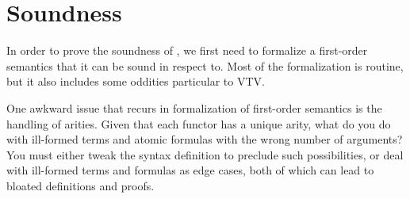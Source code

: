 \documentclass{lipics-v2021}
\begin{document}
\section{Soundness} \label{sec:soundness}

In order to prove the soundness of , we first need to formalize 
a first-order semantics that it can be sound in respect to. Most of the formalization 
is routine, but it also includes some oddities particular to VTV.

One awkward issue that recurs in formalization of first-order semantics is the 
handling of arities. Given that each functor has a unique arity,
what do you do with ill-formed terms and atomic formulas with the wrong 
number of arguments? You must either tweak the syntax definition to 
preclude such possibilities, or deal with ill-formed terms and formulas as 
edge cases, both of which can lead to bloated definitions and proofs. 
\end{document}
